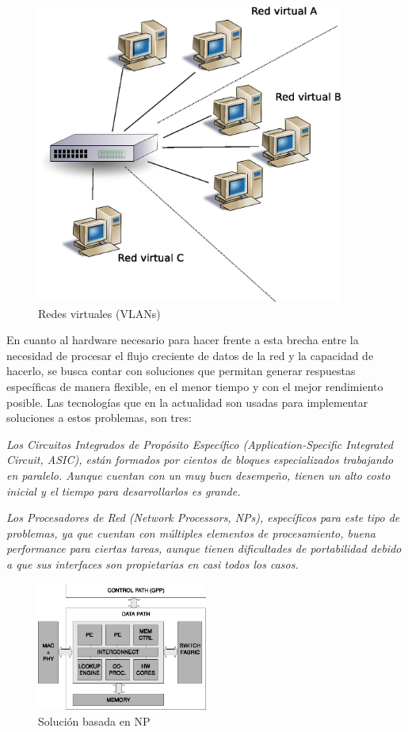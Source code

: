 \begin{figure}[h]
  \centering
	\includegraphics[width=0.90\textwidth]{1-introduccion/graf/vlan.eps}
  \caption{Redes virtuales (VLANs)}
  \label{fig:virt}
\end{figure}




En cuanto al hardware necesario para hacer frente a esta brecha entre la necesidad de procesar el flujo creciente de datos de la red y la capacidad de hacerlo, se busca contar con soluciones que permitan generar respuestas específicas de manera flexible, en el menor tiempo y con el mejor rendimiento posible. Las tecnologías que en la actualidad son usadas para implementar soluciones a estos problemas, son tres:

\emph{Los Circuitos Integrados de Propósito Específico (\textit{Application-Specific Integrated Circuit}, ASIC), están formados por cientos de bloques especializados trabajando en paralelo. Aunque cuentan con un muy buen desempeño, tienen un alto costo inicial y el tiempo para desarrollarlos es grande.}

\emph{Los Procesadores de Red (Network Processors, NPs), específicos para este tipo de problemas, ya que cuentan con múltiples elementos de procesamiento, buena performance para ciertas tareas, aunque tienen dificultades de portabilidad debido a que sus interfaces son propietarias en casi todos los casos.}
\begin{figure}[h]
  \centering
      \includegraphics[width=0.5\textwidth]{1-introduccion/graf/NP_based.eps}
  \caption{Solución basada en NP}
  \label{fig:diseno}
\end{figure}
\newpage

